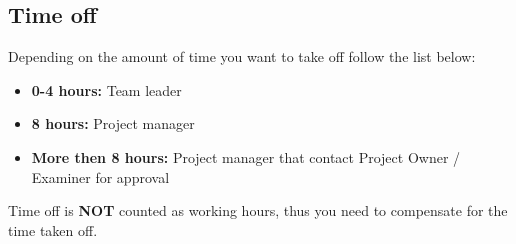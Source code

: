 \subsection*{Time off}

    Depending on the amount of time you want to take off follow the list below:
    
    \begin{itemize}
        \item[]\textbf{0-4 hours:} Team leader
        \item[]\textbf{8 hours:} Project manager
        \item[]\textbf{More then 8 hours:} Project manager that contact Project Owner / Examiner for approval
    \end{itemize}
    
    Time off is \textbf{NOT} counted as working hours, thus you need to compensate for the time taken off.